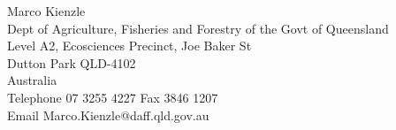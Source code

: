 \documentclass[11pt]{article}
\begin{document}
\vspace{3cm}

\noindent Marco Kienzle\\
Dept of Agriculture, Fisheries and Forestry of the Govt of Queensland\\ 
Level A2, Ecosciences Precinct, Joe Baker St\\ 
Dutton Park  QLD-4102\\
Australia \\
Telephone 07 3255 4227 Fax 3846 1207\\ 
Email Marco.Kienzle@daff.qld.gov.au\\ 
\end{document}
